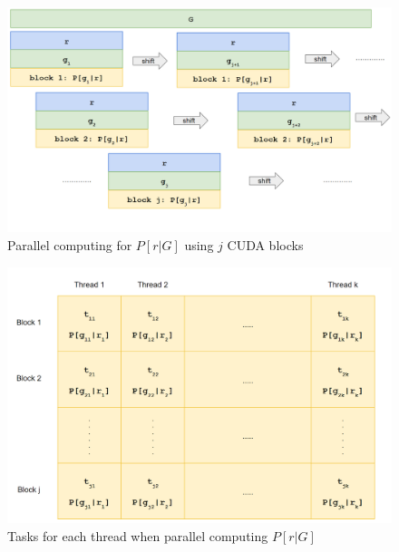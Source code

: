 \documentclass{PHlab-thesis}
\begin{document}
\begin{figure}
	\centering
	\includegraphics[scale=0.3]{figures/prG.png}
	\caption{Parallel computing for $P[r|G]$ using $j$ CUDA blocks}
	\label{fig:prG} %
\end{figure}
\begin{figure}
	\centering
	\includegraphics[scale=0.3]{figures/threadview.png}
	\caption{Tasks for each thread when parallel computing $P[r|G]$}
	\label{fig:tv} %
\end{figure}
\end{document}
